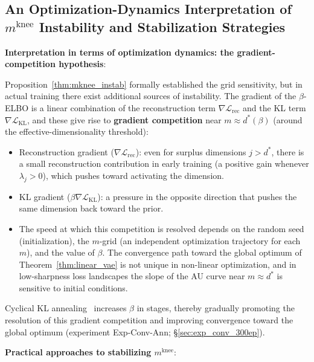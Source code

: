 \documentclass[make,article,submit,pdftex,moreauthors]{Definitions/mdpi}
\newcommand{\mknee}{m^{\mathrm{knee}}}
\begin{document}
\subsection{An Optimization-Dynamics Interpretation of $\mknee$ Instability and Stabilization Strategies}\label{sec:disc_mknee_improve}

\textbf{Interpretation in terms of optimization dynamics: the gradient-competition hypothesis}:

Proposition~\ref{thm:mknee_instab} formally established the grid sensitivity, but in
actual training there exist additional sources of instability.
The gradient of the $\beta$-ELBO is a linear combination of the reconstruction term
$\nabla\mathcal{L}_\mathrm{rec}$ and the KL term $\nabla\mathcal{L}_\mathrm{KL}$,
and these give rise to \textbf{gradient competition} near $m \approx d^*(\beta)$
(around the effective-dimensionality threshold):

\begin{itemize}
  \item Reconstruction gradient ($\nabla\mathcal{L}_\mathrm{rec}$): even for surplus
        dimensions $j > d^*$, there is a small reconstruction contribution in early
        training (a positive gain whenever $\lambda_j > 0$), which pushes toward
        activating the dimension.
  \item KL gradient ($\beta\nabla\mathcal{L}_\mathrm{KL}$): a pressure in the opposite
        direction that pushes the same dimension back toward the prior.
  \item The speed at which this competition is resolved depends on the random seed
        (initialization), the $m$-grid (an independent optimization trajectory for
        each $m$), and the value of $\beta$. The convergence path toward the global
        optimum of Theorem~\ref{thm:linear_vae} is not unique in non-linear
        optimization, and in low-sharpness loss landscapes the slope of the AU curve
        near $m \approx d^*$ is sensitive to initial conditions.
\end{itemize}

Cyclical KL annealing~\cite{fu2019cyclical} increases $\beta$ in stages, thereby
gradually promoting the resolution of this gradient competition and improving
convergence toward the global optimum
(experiment Exp-Conv-Ann; \S\ref{sec:exp_conv_300ep}).

\textbf{Practical approaches to stabilizing $\mknee$}:
\end{document}
